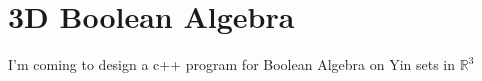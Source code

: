 \documentclass[a4paper]{book}
\makeatletter
\newcommand{\voidenvironment}[1]{%
  \expandafter\providecommand\csname env@#1@save@env\endcsname{}%
  \expandafter\providecommand\csname env@#1@process\endcsname{}%
  \@ifundefined{#1}{}{\RenewEnviron{#1}{}}%
}
\numberwithin{equation}{chapter}
\theoremstyle{definition}
\makeatother
\begin{document}
\pagestyle{empty}

\tableofcontents
\clearpage

\pagestyle{fancy}
\fancyhead{}

\setcounter{chapter}{0}




\chapter{3D Boolean Algebra}
I'm coming to design a c++ program for Boolean Algebra on Yin sets in $ \mathbb{R}^3 $ 
\end{document}
